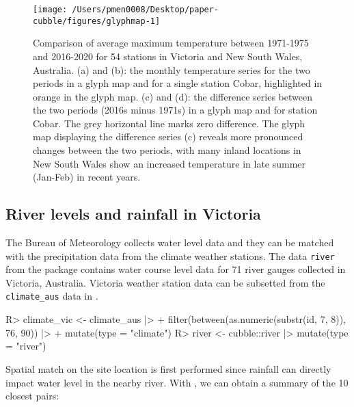 \documentclass[
  shortnames]{jss}
\begin{document}
\begin{CodeChunk}
\begin{figure}

{\centering \texttt{[image: /Users/pmen0008/Desktop/paper-cubble/figures/glyphmap-1]} 

}

\caption[Comparison of average maximum temperature between 1971-1975 and 2016-2020 for 54 stations in Victoria and New South Wales, Australia]{Comparison of average maximum temperature between 1971-1975 and 2016-2020 for 54 stations in Victoria and New South Wales, Australia. (a) and (b): the monthly temperature series for the two periods in a glyph map and for a single station Cobar, highlighted in orange in the glyph map. (c) and (d): the difference series between the two periods (2016s minus 1971s) in a glyph map and for station Cobar. The grey horizontal line marks zero difference. The glyph map displaying the difference series (c) reveals more pronounced changes between the two periods, with many inland locations in New South Wales show an increased temperature in late summer (Jan-Feb) in recent years.}\label{fig:glyphmap}
\end{figure}
\end{CodeChunk}

\hypertarget{river-levels-and-rainfall-in-victoria}{%
\subsection{River levels and rainfall in Victoria}\label{river-levels-and-rainfall-in-victoria}}

The Bureau of Meteorology collects water level data and they can be matched with the precipitation data from the climate weather stations. The data \texttt{river} from the  package contains water course level data for 71 river gauges collected in Victoria, Australia. Victoria weather station data can be subsetted from the \texttt{climate\_aus} data in .

\begin{CodeChunk}
\begin{CodeInput}
R> climate_vic <- climate_aus |>
+   filter(between(as.numeric(substr(id, 7, 8)), 76, 90)) |>
+   mutate(type = "climate")
R> river <- cubble::river |> mutate(type = "river") 
\end{CodeInput}
\end{CodeChunk}

Spatial match on the site location is first performed since rainfall can directly impact water level in the nearby river. With , we can obtain a summary of the 10 closest pairs:
\end{document}
